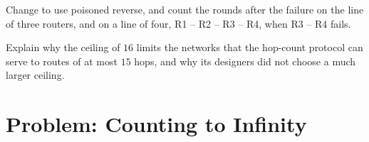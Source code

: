 \begin{exercise}[$\star\star\star$]\label{exo:g12:routing:14}
Change  to use poisoned reverse, and count the rounds after the failure on the line of three routers,
and on a line of four, R1 -- R2 -- R3 -- R4, when R3 -- R4 fails.
\end{exercise}

\begin{exercise}[$\star\star\star$]\label{exo:g12:routing:15}
Explain why the ceiling of $16$ limits the networks that the hop-count protocol can serve to routes of at most $15$
hops, and why its designers did not choose a much larger ceiling.
\end{exercise}

\section{Problem: Counting to Infinity}\label{sec:g12:routing:problem}

